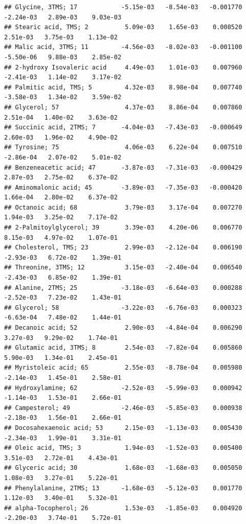 \documentclass[]{article}
\begin{document}
\begin{verbatim}
## Glycine, 3TMS; 17            -5.15e-03   -8.54e-03   -0.001770   -2.24e-03   2.89e-03    9.03e-03
## Stearic acid, TMS; 2          5.09e-03    1.65e-03    0.008520    2.51e-03   3.75e-03    1.13e-02
## Malic acid, 3TMS; 11         -4.56e-03   -8.02e-03   -0.001100   -5.50e-06   9.88e-03    2.85e-02
## 2-hydroxy Isovaleric acid     4.49e-03    1.01e-03    0.007960   -2.41e-03   1.14e-02    3.17e-02
## Palmitic acid, TMS; 5         4.32e-03    8.98e-04    0.007740   -3.58e-03   1.34e-02    3.59e-02
## Glycerol; 57                  4.37e-03    8.86e-04    0.007860    2.51e-04   1.40e-02    3.63e-02
## Succinic acid, 2TMS; 7       -4.04e-03   -7.43e-03   -0.000649    2.60e-03   1.96e-02    4.90e-02
## Tyrosine; 75                  4.06e-03    6.22e-04    0.007510   -2.86e-04   2.07e-02    5.01e-02
## Benzeneacetic acid; 47       -3.87e-03   -7.31e-03   -0.000429    2.87e-03   2.75e-02    6.37e-02
## Aminomalonic acid; 45        -3.89e-03   -7.35e-03   -0.000420    1.66e-04   2.80e-02    6.37e-02
## Octanoic acid; 68             3.79e-03    3.17e-04    0.007270    1.94e-03   3.25e-02    7.17e-02
## 2-Palmitoylglycerol; 39       3.39e-03    4.20e-06    0.006770    8.15e-03   4.97e-02    1.07e-01
## Cholesterol, TMS; 23          2.99e-03   -2.12e-04    0.006190   -2.93e-03   6.72e-02    1.39e-01
## Threonine, 3TMS; 12           3.15e-03   -2.40e-04    0.006540   -2.43e-03   6.85e-02    1.39e-01
## Alanine, 2TMS; 25            -3.18e-03   -6.64e-03    0.000288   -2.52e-03   7.23e-02    1.43e-01
## Glycerol; 58                 -3.22e-03   -6.76e-03    0.000323   -6.63e-04   7.48e-02    1.44e-01
## Decanoic acid; 52             2.90e-03   -4.84e-04    0.006290    3.27e-03   9.29e-02    1.74e-01
## Glutamic acid, 3TMS; 8        2.54e-03   -7.82e-04    0.005860    5.90e-03   1.34e-01    2.45e-01
## Myristoleic acid; 65          2.55e-03   -8.78e-04    0.005980   -2.14e-03   1.45e-01    2.58e-01
## Hydroxylamine; 62            -2.52e-03   -5.99e-03    0.000942   -1.14e-03   1.53e-01    2.66e-01
## Campesterol; 49              -2.46e-03   -5.85e-03    0.000938   -2.18e-03   1.56e-01    2.66e-01
## Docosahexaenoic acid; 53      2.15e-03   -1.13e-03    0.005430   -2.34e-03   1.99e-01    3.31e-01
## Oleic acid, TMS; 3            1.94e-03   -1.52e-03    0.005400    3.51e-03   2.72e-01    4.43e-01
## Glyceric acid; 30             1.68e-03   -1.68e-03    0.005050    1.08e-03   3.27e-01    5.22e-01
## Phenylalanine, 2TMS; 13      -1.68e-03   -5.12e-03    0.001770    1.12e-03   3.40e-01    5.32e-01
## alpha-Tocopherol; 26          1.53e-03   -1.85e-03    0.004920   -2.20e-03   3.74e-01    5.72e-01

\end{verbatim}
\end{document}
